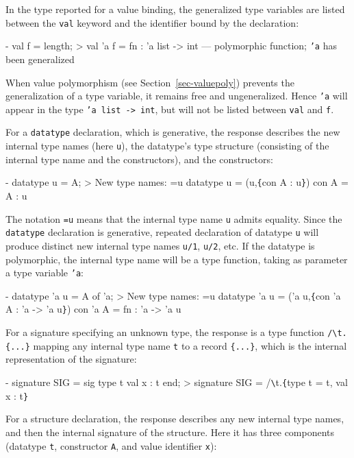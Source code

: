 \documentclass[fleqn,a4paper]{article}
\begin{document}
In the type reported for a value binding, the generalized type
variables are listed between the \texttt{val} keyword and the
identifier bound by the declaration:

\begin{program}
- val f = length;
> val 'a f = fn : 'a list -> int        \rm{--- polymorphic function; \texttt{'a} has been generalized}
\end{program}

\noindent When value polymorphism (see
Section~\ref{sec-valuepoly}) prevents the generalization of a type
variable, it remains free and ungeneralized.  Hence \texttt{'a} will
appear in the type \texttt{'a list -> int}, but will not be listed
between \texttt{val} and \texttt{f}.

For a \texttt{datatype} declaration, which is generative, the response
describes the new internal type names (here \texttt{u}), the
datatype's type structure (consisting of the internal type name and
the constructors), and the constructors:

\begin{program}
- datatype u = A;
> New type names: =u
  datatype u = (u,\verb+{+con A : u\verb+}+)
  con A = A : u
\end{program}

\noindent
The notation \texttt{=u} means that the internal type name \texttt{u}
admits equality.  Since the \texttt{datatype} declaration is
generative, repeated declaration of datatype \texttt{u} will produce
distinct new internal type names \texttt{u/1}, \texttt{u/2}, etc.  If
the datatype is polymorphic, the internal type name will be a type
function, taking as parameter a type variable \texttt{'a}:

\begin{program}
- datatype 'a u = A of 'a;
> New type names: =u
  datatype 'a u = ('a u,\verb+{+con 'a A : 'a -> 'a u\verb+}+)
  con 'a A = fn : 'a -> 'a u
\end{program}

\noindent 
For a signature specifying an unknown type, the response is a type
function \verb+/\t.{...}+ mapping any internal type name \texttt{t} to
a record \verb+{...}+, which is the internal representation of the
signature:

\begin{program}
- signature SIG = sig type t val x : t end;
> signature SIG = /\verb+\+t.\verb+{+type t = t, val x : t\verb+}+
\end{program}

\noindent 
For a structure declaration, the response describes any new internal
type names, and then the internal signature of the structure.  Here it
has three components (datatype \texttt{t}, constructor \texttt{A}, and
value identifier \texttt{x}):
\end{document}
